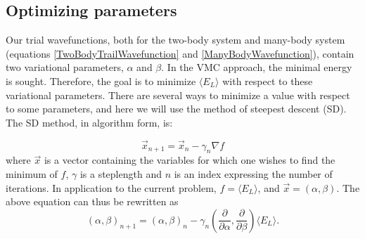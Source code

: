 \documentclass[english, a4paper]{article}
\newcommand\lr[1]{\left(#1\right)}
\begin{document}
\begin{figure}[H]
\begin{center}
		\end{center}
	\end{figure}
	
	
	
	\subsection{Optimizing parameters}
	Our trial wavefunctions, both for the two-body system and many-body system (equations \ref{TwoBodyTrailWavefunction} and \ref{ManyBodyWavefunction}), contain two variational parameters, $\alpha$ and $\beta$.
	In the VMC approach, the minimal energy is sought. Therefore, the goal is to minimize $\langle E_L\rangle$ with respect to these variational parameters.
	There are several ways to minimize a value with respect to some parameters, and here we will use the method of steepest descent (SD). The SD method, in algorithm form, is:
	
	\begin{equation}
		\vec{x}_{n+1} = \vec{x}_n - \gamma_n\nabla f
	\end{equation}
	where $\vec{x}$ is a vector containing the variables for which one wishes to find the minimum of $f$, $\gamma$ is a steplength and $n$ is an index expressing the number of iterations. In application to the current problem, $f = \langle E_L\rangle$, and $\vec{x}=\lr{\alpha, \beta}$. The above equation can thus be rewritten as
	\begin{equation}
	\lr{\alpha, \beta}_{n+1} = \lr{\alpha, \beta}_n - \gamma_n(\frac{\partial}{\partial \alpha}, \frac{\partial}{\partial \beta})  \langle E_L\rangle. \label{optimizationAlgo}
	\end{equation}
	
\end{document}
